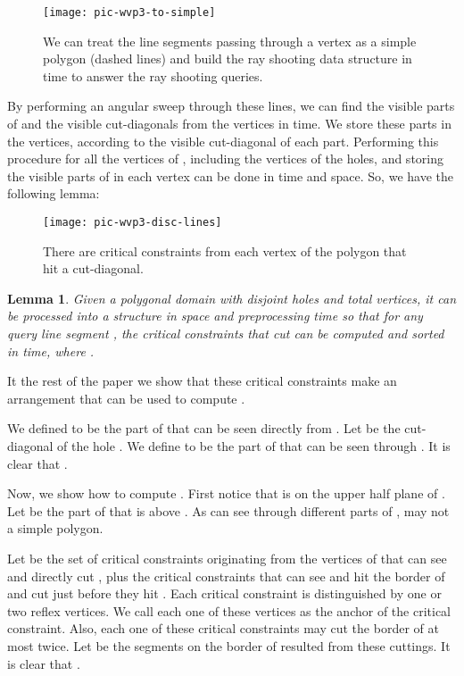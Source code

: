 \documentclass[5p]{elsarticle}
\newtheorem{lemma}[theorem]{Lemma}
\begin{document}
\begin{figure}[h]
  \centering
  \texttt{[image: pic-wvp3-to-simple]} 
  \caption{We can treat the line segments passing through a vertex  as a simple
  polygon (dashed lines) and build the ray shooting data structure  in  time to answer the ray shooting 
  queries.}
  \label{fig:wvp3-to-simple}
\end{figure}



By performing an angular sweep through these lines, we can find the visible 
parts of  and the visible cut-diagonals from the vertices in  time.
We store these parts in the vertices, according to the visible cut-diagonal of each part.
Performing this procedure for all the vertices of , including the vertices of the holes,
and storing the visible parts of  in each vertex
can be done in  time and  space. So, we have the following
lemma:


\begin{figure}[h]
  \centering
  \texttt{[image: pic-wvp3-disc-lines]} 
  \caption{There are  critical constraints from each vertex 
  of the polygon that hit a cut-diagonal.}
  \label{fig:wvp3-disc-lines}
\end{figure}


\begin{lemma}
Given a polygonal domain  with  disjoint holes and  total vertices, 
it can be processed into a structure in 
space and  preprocessing time so that for any query
line segment , the critical constraints that cut 
can be computed and sorted in  time, where .
\end{lemma}

It the rest of the paper we show that these critical constraints make an arrangement
that can be used to compute .  



We defined  to be the part of  that can be seen directly from .
Let  be the cut-diagonal of the hole .
We define  to be the part of  that can be seen  through .
It is clear that . 

Now, we show how to compute . First notice that  is on the
upper half plane of .
Let  be the part of  that is above . 
As  can see  through different parts of , 
may not a simple polygon.

Let  be the set of critical constraints originating from the vertices of 
that can see  and directly cut , plus the critical constraints
that can see  and hit the border of  and cut  just before they hit .
Each critical constraint is distinguished by one or two reflex vertices. 
We call each one of these vertices as the anchor of the critical constraint.
Also, each one of these 
critical constraints may cut the border of  at most twice. Let  be the segments 
on the border of  resulted from these cuttings. It is clear that 
. 
\end{document}
